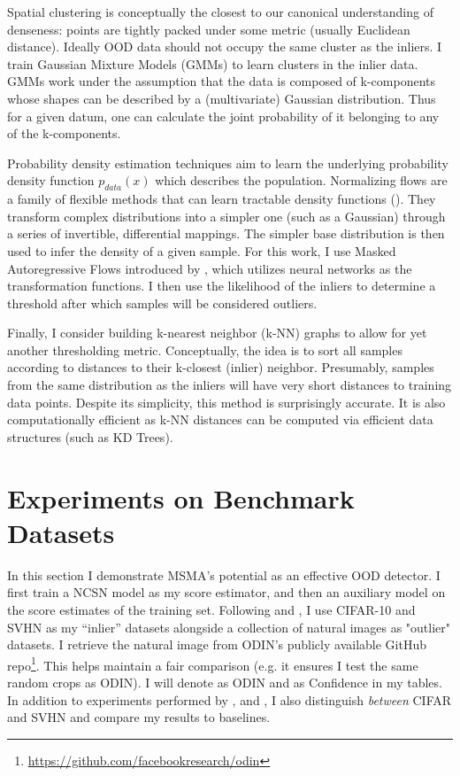 Spatial clustering is conceptually the closest to our canonical understanding of denseness: points are tightly packed under some metric (usually Euclidean distance). Ideally OOD data should not occupy the same cluster as the inliers. I train Gaussian Mixture Models (GMMs) to learn clusters in the inlier data. GMMs work under the assumption that the data is composed of k-components whose shapes can be described by a (multivariate) Gaussian distribution. Thus for a given datum, one can calculate the joint probability of it belonging to any of the k-components.

Probability density estimation techniques aim to learn the underlying probability density function $p_{data} (x)$ which describes the population. Normalizing flows are a family of flexible methods that can learn tractable density functions (\cite{Papamakarios2019}). They transform complex distributions into a simpler one (such as a Gaussian) through a series of invertible, differential mappings. The simpler base distribution is then used to infer the density of a given sample. For this work, I use Masked Autoregressive Flows introduced by \cite{Papamakarios2017masked}, which utilizes neural networks as the transformation functions. I then use the likelihood of the inliers to determine a threshold after which samples will be considered outliers.

Finally, I consider building k-nearest neighbor (k-NN) graphs to allow for yet another thresholding metric. Conceptually, the idea is to sort all samples according to distances to their k-closest (inlier) neighbor. Presumably, samples from the same distribution as the inliers will have very short distances to training data points. Despite its simplicity, this method is surprisingly accurate. It is also computationally efficient as k-NN distances can be computed via efficient data structures (such as KD Trees).


\section{Experiments on Benchmark Datasets}
\label{experiments}

In this section I demonstrate MSMA's potential as an effective OOD detector. I first train a NCSN model as my score estimator, and then an auxiliary model on the score estimates of the training set. Following \cite{Liang2017} and \cite{Devries}, I use CIFAR-10 and SVHN as my “inlier” datasets alongside a collection of natural images as "outlier" datasets. I retrieve the natural image from ODIN's publicly available GitHub repo\footnote{\url{https://github.com/facebookresearch/odin}}. This helps maintain a fair comparison (e.g. it ensures I test the same random crops as ODIN). I will denote \cite{Liang2017} as ODIN and \cite{Devries} as Confidence in my tables.
In addition to experiments performed by \cite{Hendrycks2019}, \cite{Liang2017} and \cite{Devries}, I also distinguish \textit{between} CIFAR and SVHN and compare my results to baselines.

